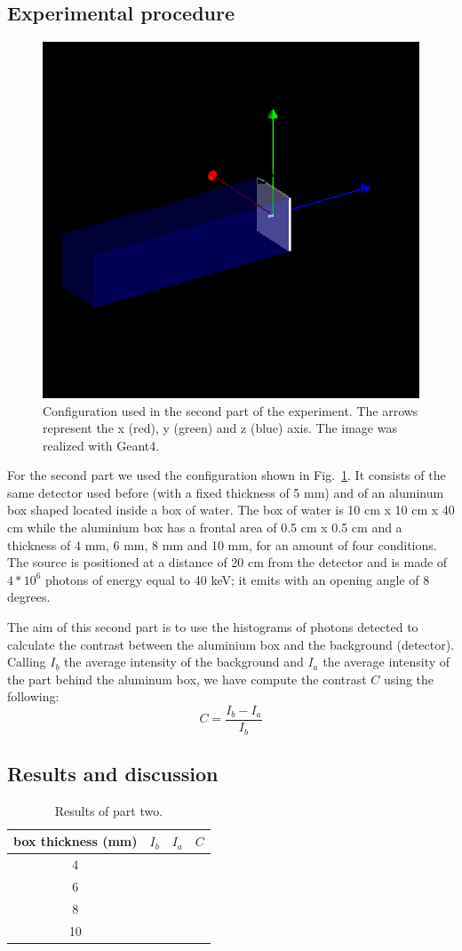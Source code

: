 \documentclass[a4paper]{article}
\begin{document}
\subsection{Experimental procedure}
\begin{figure}[!htb]
  \centering
  \includegraphics[width=0.6\columnwidth]{detector2.png}
  \caption{Configuration used in the second part of the experiment. The arrows represent the x (red), y (green) and z (blue) axis. The image was realized with Geant4.}
  \label{fig:conf2}
\end{figure}
For the second part we used the configuration shown in Fig.~\ref{fig:conf2}. It consists of the same detector used before (with a fixed thickness of 5 mm) and of an aluminum box shaped located inside a box of water. The box of water is 10 cm x 10 cm x 40 cm while the aluminium box has a frontal area of 0.5 cm x 0.5 cm and a thickness of 4 mm, 6 mm, 8 mm and 10 mm, for an amount of four conditions. The source is positioned at a distance of 20 cm from the detector and is made of $4*10^{6}$ photons of energy equal to 40 keV; it emits with an opening angle of 8 degrees.

The aim of this second part is to use the histograms of photons detected to calculate the contrast between the aluminium box and the background (detector). Calling $I_{b}$ the average intensity of the background and $I_{a}$ the average intensity of the part behind the aluminum box, we have compute the contrast $C$ using the following:
\begin{equation}
  C=\frac{I_{b}-I_{a}}{I_{b}}
  \label{eq:contrast}
\end{equation}

\subsection{Results and discussion}
\begin{table}[!htb]
  \centering
  \begin{tabular}{|c|c|c|c|}
    \hline
    box thickness (mm) & $I_{b}$ & $I_{a}$ & $C$ \\
    \hline
    4 & & & \\
    \hline
    6 & & & \\
    \hline
    8 & & & \\
    \hline
    10 & & & \\
    \hline
  \end{tabular}
  \caption{Results of part two.}
  \label{tab:part_two}
\end{table}
\end{document}
